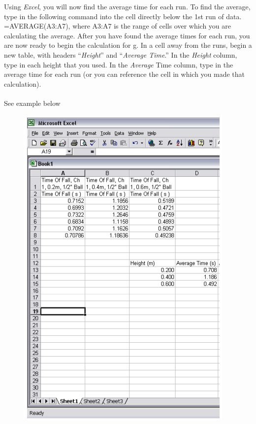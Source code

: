 Using \emph{Excel}, you will now find the average time for each run. To find the average, type in the
following command into the cell directly below the 1st
run of data. =AVERAGE(A3:A7), where
A3:A7 is the range of cells over which you are calculating the average. After you have found the
average times for each run, you are now ready to begin the calculation for g. In a cell away from
the runs, begin a new table, with headers “\emph{Height}” and “\emph{Average Time}.” In the \emph{Height} column,
type in each height that you used. In the \emph{Average} Time column, type in the average time for each
run (or you can reference the cell in which you made that calculation).\\\\
See example below\\

\newpage

\begin{figure}[h!]
  \centerline{\includegraphics[scale=0.45]{resources/photo12.png}}
\end{figure}

